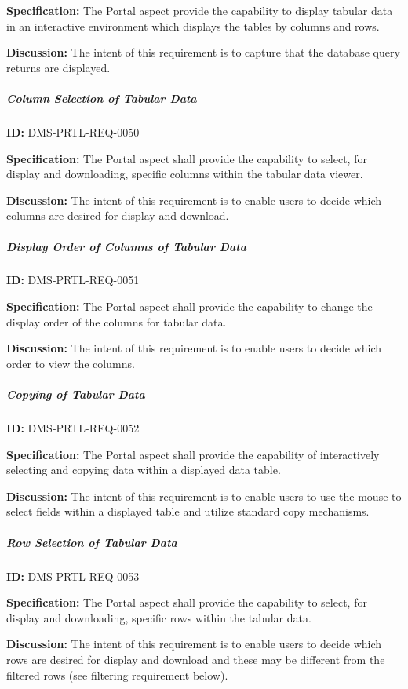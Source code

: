 \documentclass[SE,toc,lsstdraft]{lsstdoc}
\begin{document}
\textbf{Specification:}
The Portal aspect provide the capability to display tabular data in an interactive environment which displays the tables by columns and rows.

\textbf{Discussion:}
The intent of this requirement is to capture that the database query returns are displayed.

\subparagraph{Column Selection of Tabular Data}\hfill  %

\label{DMS-PRTL-REQ-0050}
\textbf{ID:} DMS-PRTL-REQ-0050

\textbf{Specification:}
The Portal aspect shall provide the capability to select, for display and downloading, specific columns within the tabular data viewer.

\textbf{Discussion:}
The intent of this requirement is to enable users to decide which columns are desired for display and download.

\subparagraph{Display Order of Columns of Tabular Data}\hfill  %

\label{DMS-PRTL-REQ-0051}
\textbf{ID:} DMS-PRTL-REQ-0051

\textbf{Specification:}
The Portal aspect shall provide the capability to change the display order of the columns for tabular data.

\textbf{Discussion:}
The intent of this requirement is to enable users to decide which order to view the columns.

\subparagraph{Copying of Tabular Data}\hfill  %

\label{DMS-PRTL-REQ-0052}
\textbf{ID:} DMS-PRTL-REQ-0052

\textbf{Specification:}
The Portal aspect shall provide the capability of interactively selecting and copying data within a displayed data table.

\textbf{Discussion:}
The intent of this requirement is to enable users to use the mouse to select fields within a displayed table and utilize standard copy mechanisms.

\subparagraph{Row Selection of Tabular Data}\hfill  %

\label{DMS-PRTL-REQ-0053}
\textbf{ID:} DMS-PRTL-REQ-0053

\textbf{Specification:}
The Portal aspect shall provide the capability to select, for display and downloading, specific rows within the tabular data.

\textbf{Discussion:}
The intent of this requirement is to enable users to decide which rows are desired for display and download and these may be different from the filtered rows (see filtering requirement below).
\end{document}
